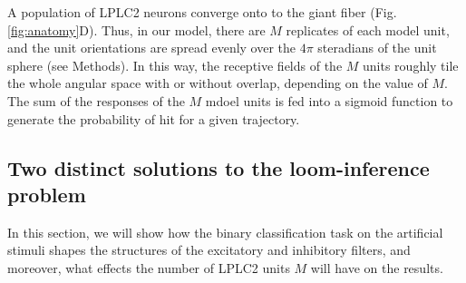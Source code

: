 \documentclass[9pt,lineno]{elife}
\begin{document}
A population of LPLC2 neurons converge onto to the giant fiber (Fig. \ref{fig:anatomy}D). Thus, in our model, there are $M$ replicates of each model unit, and the unit orientations are spread evenly over the $4\pi$ steradians of the unit sphere (see Methods). In this way, the receptive fields of the $M$ units roughly  tile the whole angular space with or without overlap, depending on the value of $M$. The sum of the responses of the $M$ mdoel units is fed into a sigmoid function to generate the probability of hit for a given trajectory. 



\subsection{Two distinct solutions to the loom-inference problem}





In this section, we will show how the binary classification task on the artificial stimuli shapes the structures of the excitatory and inhibitory filters, and moreover, what effects the number of LPLC2 units $M$ will have on the results.
\end{document}
